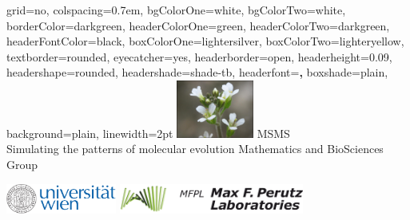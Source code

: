 \documentclass[portrait,final]{baposter}
\begin{document}



\newcommand{\bs}[1]{\boldsymbol{#1}}

\begin{poster}%
{
grid=no,
colspacing=0.7em,
bgColorOne=white,%
bgColorTwo=white,%
borderColor=darkgreen,%
headerColorOne=green,%
headerColorTwo=darkgreen,%
headerFontColor=black,
boxColorOne=lightersilver,
boxColorTwo=lighteryellow,
textborder=rounded,
eyecatcher=yes,
headerborder=open,
headerheight=0.09\textheight, 
headershape=rounded,
headershade=shade-tb,
headerfont=\Large\textbf, %
boxshade=plain, 
background=plain,
linewidth=2pt
}
{\includegraphics[height=1.9cm]{Arabidopsis_thaliana_inflorescenciasB.jpg}\hspace{.2cm} 
} 
{\huge MSMS\\ \LARGE Simulating the patterns of molecular evolution}
{\sc \hspace{1cm} Mathematics and BioSciences Group
}
{
\begin{minipage}{0.2625\textwidth}
\includegraphics[height=1cm]{uni_logo_farbe_01.pdf}
\newline
\includegraphics[height=1cm]{mfpl_logo3d_transparent.png}

\end{minipage}}
\end{poster}
\end{document}
